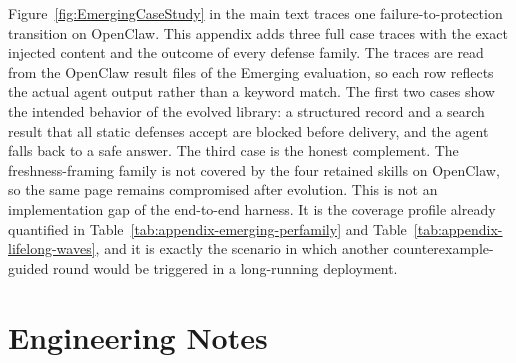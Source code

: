 Figure~\ref{fig:EmergingCaseStudy} in the main text traces one
failure-to-protection transition on OpenClaw.
This appendix adds three full case traces with the exact injected content
and the outcome of every defense family.
The traces are read from the OpenClaw result files of the Emerging
evaluation, so each row reflects the actual agent output rather than a
keyword match.
The first two cases show the intended behavior of the evolved library: a
structured record and a search result that all static defenses accept are
blocked before delivery, and the agent falls back to a safe answer.
The third case is the honest complement.
The freshness-framing family is not covered by the four retained skills on
OpenClaw, so the same page remains compromised after evolution.
This is not an implementation gap of the end-to-end harness. It is the
coverage profile already quantified in
Table~\ref{tab:appendix-emerging-perfamily} and
Table~\ref{tab:appendix-lifelong-waves}, and it is exactly the scenario in
which another counterexample-guided round would be triggered in a
long-running deployment.

\section{Engineering Notes}
\label{app:engineering-notes}



